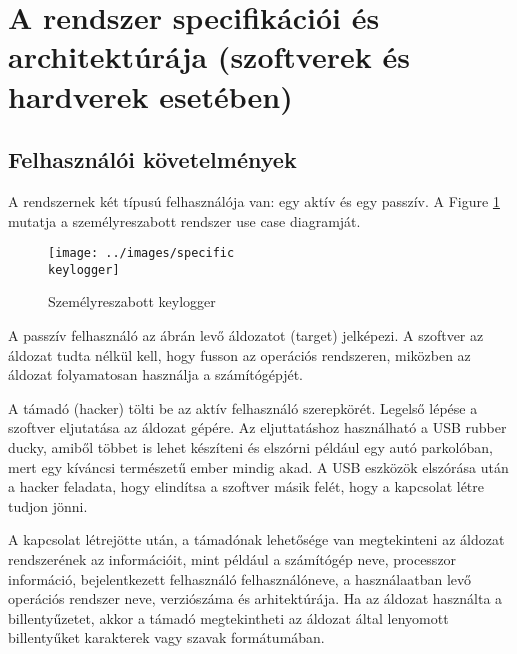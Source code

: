 \documentclass[a4paper, 11pt]{article}
\begin{document}
\cleardoublepage
\section{A rendszer specifikációi és architektúrája (szoftverek és hardverek esetében)}\label{sec:specs_and_arch}

\subsection{Felhasználói követelmények}


A rendszernek két típusú felhasználója van: egy aktív és egy passzív. A Figure \ref{fig:specifickeylogger} mutatja a személyreszabott rendszer use case diagramját.
\begin{figure}[H]
\centering
\texttt{[image: ../images/specific\\ keylogger]}
\caption{Személyreszabott keylogger}
\label{fig:specifickeylogger}
\end{figure}

A passzív felhasználó az ábrán levő áldozatot (target) jelképezi. A szoftver az áldozat tudta nélkül kell, hogy fusson az operációs rendszeren, miközben az áldozat folyamatosan használja a számítógépjét.

A támadó (hacker) tölti be az aktív felhasználó szerepkörét. Legelső lépése a szoftver eljutatása az áldozat gépére. Az eljuttatáshoz használható a USB rubber ducky, amiből többet is lehet készíteni és elszórni például egy autó parkolóban, mert egy kíváncsi természetű ember mindig akad. A USB eszközök elszórása után a hacker feladata, hogy elindítsa a szoftver másik felét, hogy a kapcsolat létre tudjon jönni.

A kapcsolat létrejötte után, a támadónak lehetősége van megtekinteni az áldozat rendszerének az információit, mint például a számítógép neve, processzor információ, bejelentkezett felhasználó felhasználóneve, a használaatban levő operációs rendszer neve, verziószáma és arhitektúrája. Ha az áldozat használta a billentyűzetet, akkor a támadó megtekintheti az áldozat által lenyomott billentyűket karakterek vagy szavak formátumában.
\end{document}
